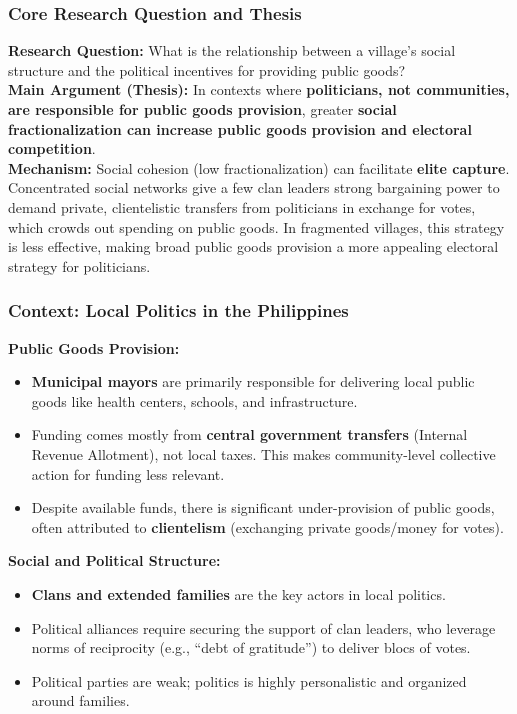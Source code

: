\documentclass{article}
\begin{document}
    \subsubsection{Core Research Question and Thesis}

    \noindent \textbf{Research Question:} What is the relationship between a
village's social structure and the political incentives for providing public
goods?\\

    \noindent \textbf{Main Argument (Thesis):} In contexts where
\textbf{politicians, not communities, are responsible for public goods provision}, greater \textbf{social fractionalization can increase public goods provision and electoral competition}.\\

    \noindent \textbf{Mechanism:} Social cohesion (low fractionalization)
can facilitate \textbf{elite capture}. Concentrated social networks give a
few clan leaders strong bargaining power to demand private, clientelistic
transfers from politicians in exchange for votes, which crowds out spending
on public goods. In fragmented villages, this strategy is less effective,
making broad public goods provision a more appealing electoral strategy for
politicians.

    \subsubsection{Context: Local Politics in the Philippines}

    \noindent \textbf{Public Goods Provision:}
    \begin{itemize}
        \item \textbf{Municipal mayors} are primarily responsible for
        delivering local public goods like health centers, schools, and
        infrastructure.
        \item Funding comes mostly from \textbf{central government transfers} (Internal Revenue Allotment), not local taxes. This makes community-level collective action for funding less relevant.
        \item Despite available funds, there is significant under-provision
        of public goods, often attributed to
        \textbf{clientelism} (exchanging private goods/money for votes).
    \end{itemize}

    \noindent \textbf{Social and Political Structure:}
    \begin{itemize}
        \item \textbf{Clans and extended families} are the key actors in
        local politics.
        \item Political alliances require securing the support of clan
        leaders, who leverage norms of reciprocity (e.g., ``debt of
        gratitude'') to deliver blocs of votes.
        \item Political parties are weak; politics is highly personalistic
        and organized around families.
    \end{itemize}
\end{document}
